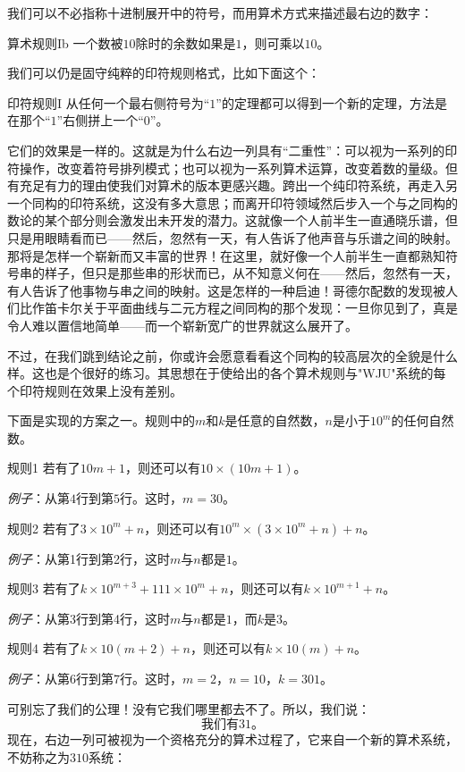 我们可以不必指称十进制展开中的符号，而用算术方式来描述最右边的数字：
\begin{thm}{算术规则Ib}
一个数被$10$除时的余数如果是$1$，则可乘以$10$。
\end{thm}

我们可以仍是固守纯粹的印符规则格式，比如下面这个：
\begin{thm}{印符规则I}
从任何一个最右侧符号为“$1$”的定理都可以得到一个新的定理，方法是在那个“$1$”右侧拼上一个“$0$”。
\end{thm}
它们的效果是一样的。这就是为什么右边一列具有“二重性”：可以视为一系列的印符操作，改变着符号排列模式；也可以视为一系列算术运算，改变着数的量级。但有充足有力的理由使我们对算术的版本更感兴趣。跨出一个纯印符系统，再走入另一个同构的印符系统，这没有多大意思；而离开印符领域然后步入一个与之同构的数论的某个部分则会激发出未开发的潜力。这就像一个人前半生一直通晓乐谱，但只是用眼睛看而已——然后，忽然有一天，有人告诉了他声音与乐谱之间的映射。那将是怎样一个崭新而又丰富的世界！在这里，就好像一个人前半生一直都熟知符号串的样子，但只是那些串的形状而已，从不知意义何在——然后，忽然有一天，有人告诉了他事物与串之间的映射。这是怎样的一种启迪！哥德尔配数的发现被人们比作笛卡尔关于平面曲线与二元方程之间同构的那个发现：一旦你见到了，真是令人难以置信地简单——而一个崭新宽广的世界就这么展开了。

不过，在我们跳到结论之前，你或许会愿意看看这个同构的较高层次的全貌是什么样。这也是个很好的练习。其思想在于使给出的各个算术规则与"WJU"系统的每个印符规则在效果上没有差别。

下面是实现的方案之一。规则中的$m$和$k$是任意的自然数，$n$是小于$10^m$的任何自然数。

\begin{thm}{规则1}
若有了$10m+1$，则还可以有$10\times(10m+1)$。

\emph{例子}：从第$4$行到第$5$行。这时，$m=30$。

\item[规则2]
若有了$3\times10^m+n$，则还可以有$10^m\times(3\times10^m+n)+n$。

\emph{例子}：从第1行到第2行，这时$m$与$n$都是$1$。

\item[规则3]
若有了$k\times10^{m+3}+111\times10^m+n$，则还可以有$k\times10^{m+1}+n$。

\emph{例子}：从第3行到第4行，这时$m$与$n$都是$1$，而$k$是$3$。

\item[规则4]
若有了$k\times10(m+2)+n$，则还可以有$k\times10(m)+n$。

\emph{例子}：从第6行到第7行。这时，$m=2$，$n=10$，$k=301$。
\end{thm}
可别忘了我们的公理！没有它我们哪里都去不了。所以，我们说：
\[
\text{我们有$31$。}
\]
现在，右边一列可被视为一个资格充分的算术过程了，它来自一个新的算术系统，不妨称之为$310$系统：

